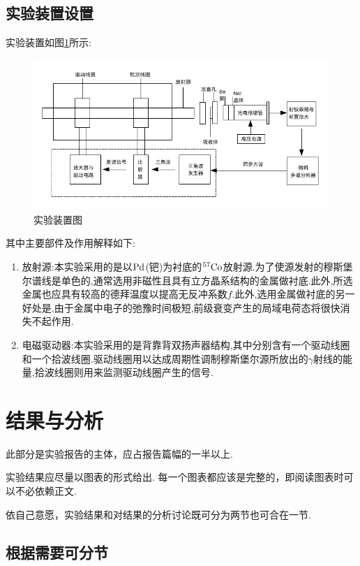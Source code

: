 \documentclass[aps,pre,12pt,preprint,onecolumn,showpacs,showkeys]{revtex4-1}
\begin{document}
\subsection{实验装置设置}
实验装置如图\ref{fig:1}所示:
\begin{figure}[htbp]
    \centering
    \includegraphics[width=\textwidth]{device.jpg}
    \caption{实验装置图}
    \label{fig:1}
\end{figure}
其中主要部件及作用解释如下:
\begin{enumerate}
    \item 放射源:本实验采用的是以$\rm{Pd}$(钯)为衬底的$^{57}\rm{Co}$放射源.为了使源发射的穆斯堡尔谱线是单色的,通常选用非磁性且具有立方晶系结构的金属做衬底.此外,所选金属也应具有较高的德拜温度以提高无反冲系数$f$.此外,选用金属做衬底的另一好处是,由于金属中电子的弛豫时间极短,前级衰变产生的局域电荷态将很快消失不起作用.
    \item 电磁驱动器:本实验采用的是背靠背双扬声器结构,其中分别含有一个驱动线圈和一个拾波线圈.驱动线圈用以达成周期性调制穆斯堡尔源所放出的$\gamma$射线的能量,拾波线圈则用来监测驱动线圈产生的信号.

\end{enumerate}
\section{结果与分析}
此部分是实验报告的主体，应占报告篇幅的一半以上.\par
实验结果应尽量以图表的形式给出. 每一个图表都应该是完整的，即阅读图表时可以不必依赖正文.\par
依自己意愿，实验结果和对结果的分析讨论既可分为两节也可合在一节.\par
\subsection{根据需要可分节}
\end{document}
